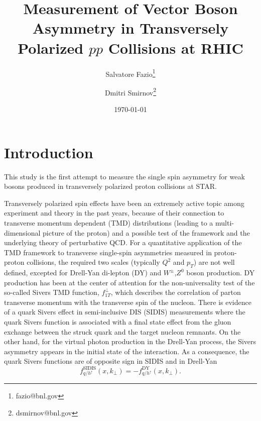 \documentclass[12pt]{article}
\begin{document}
\setcounter{section}{0}
\setcounter{subsection}{0}
\setcounter{equation}{0}
\setcounter{figure}{0}
\setcounter{footnote}{0}
\setcounter{table}{0}


\title{Measurement of Vector Boson Asymmetry in Transversely Polarized $pp$
Collisions at RHIC}

\author{Salvatore Fazio\thanks{fazio@bnl.gov}}
\author{Dmitri Smirnov\thanks{dsmirnov@bnl.gov}}

\date{\today}

\maketitle

\newpage
\tableofcontents 

\newpage
\linenumbers


\section{Introduction}

This study is the first attempt to measure the single spin asymmetry for weak bosons produced
in transversely polarized proton collisions at STAR. 

Transversely polarized spin effects have been an extremely active topic among experiment and theory in the past years, because of their connection to transverse momentum dependent (TMD) distributions (leading to a multi-dimensional picture of the proton) and a possible test of the framework and the underlying theory of perturbative QCD. For a quantitative application of the TMD framework to transverse single-spin asymmetries measured in proton-proton collisions, the required two scales (typically $Q^{2}$ and $p_{T}$) are not well defined, excepted for Drell-Yan di-lepton (DY) and $W^{\pm}$,$Z^{0}$ boson production. DY production has been at the center of attention for the non-universality test of the so-called Sivers TMD function, %
$f^{\perp}_{1T}$, which describes the correlation of parton transverse momentum with the transverse spin of the nucleon.  There is evidence of a quark Sivers effect in semi-inclusive DIS (SIDIS) measurements where the quark Sivers function is associated with a final state effect from the gluon exchange between the struck quark and the target nucleon remnants. On the other hand, for the virtual photon production in the Drell-Yan process, the Sivers asymmetry appears in the initial state of the interaction. As a consequence, the quark Sivers functions are of opposite sign in SIDIS and in Drell-Yan
%
\begin{equation}
f^\text{SIDIS}_{q/h^\uparrow} (x, k_\perp) = - f^\text{DY}_{q/h^\uparrow} (x, k_\perp).
\end{equation}
\end{document}
